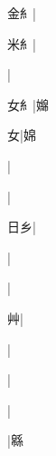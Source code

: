 \begin{multicols}{2}
{{\cjk{}{\cnsym{}　}金{糹}}|{}\par
{\cjk{}{\cnsym{}　}米{糹}}|{}\par
{}|{}\par
{\cjk{}{\cnsym{}　}女{糹}}|{\cjk{}嬵}\par
{\cjk{}{\cnsym{}　}{\cnsym{}　}女}|{\cjk{}婂}\par
{\cjk{}{\cnsym{}　}{\cnsym{}　}{\cnsym{}　}}|{}\par
{\cjk{}{\cnsym{}　}{\cnsym{}　}{\cnsym{}　}}|{}\par
{\cjk{}{\cnsym{}　}日乡}|{}\par
{\cjk{}{\cnsym{}　}{\cnsym{}　}{\cnsym{}　}}|{}\par
{\cjk{}{\cnsym{}　}{\cnsym{}　}{\cnsym{}　}}|{}\par
{\cjk{}{\cnsym{}　}{\cnsym{}　}艸}|{}\par
{\cjk{}{\cnsym{}　}{\cnsym{}　}{\cnsym{}　}}|{}\par
{\cjk{}{\cnsym{}　}{\cnsym{}　}{\cnsym{}　}}|{}\par
{}|{}\par
{\cjk{}{\cnsym{}　}{\cnsym{}　}{\cnsym{}　}}|{\cjk{}緜}\par
}
\end{multicols}
